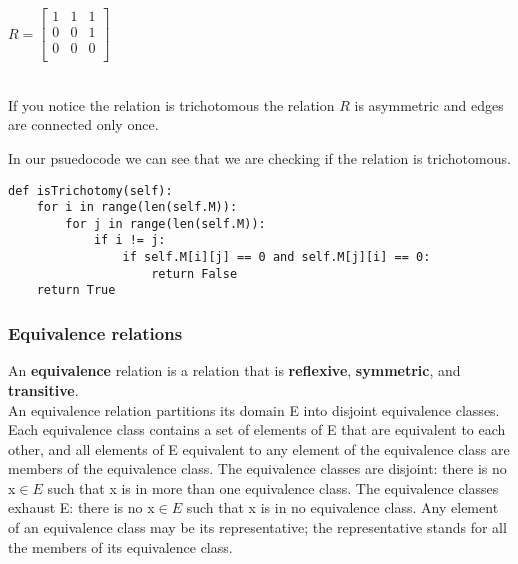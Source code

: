 $R = \begin{bmatrix}
    1 & 1 & 1 \\
    0 & 0 & 1 \\
    0 & 0 & 0 \\
\end{bmatrix}$ \\

 \\

If you notice the relation is trichotomous the relation $R$ is asymmetric and edges are connected only once.

In our psuedocode we can see that we are checking if the relation is trichotomous. \\
\begin{lstlisting}
def isTrichotomy(self):            
    for i in range(len(self.M)):
        for j in range(len(self.M)):
            if i != j:
                if self.M[i][j] == 0 and self.M[j][i] == 0:
                    return False
    return True
\end{lstlisting}



\subsubsection{Equivalence relations}
An \textbf{equivalence} relation is a relation that is \textbf{reflexive}, \textbf{symmetric}, and \textbf{transitive}. \\
An equivalence relation partitions its domain E into disjoint equivalence classes. 
Each equivalence class contains a set of elements of E that are equivalent to each other, and all elements of E equivalent to any element of the equivalence class are members of the equivalence class. 
The equivalence classes are disjoint:  there is no x$\in{E}$ such that x is in more than one equivalence class. 
The equivalence classes exhaust E:  there is no x$\in{E}$ such that x is in no equivalence class. 
Any element of an equivalence class may be its representative; the representative stands for all the members of its equivalence class. 

